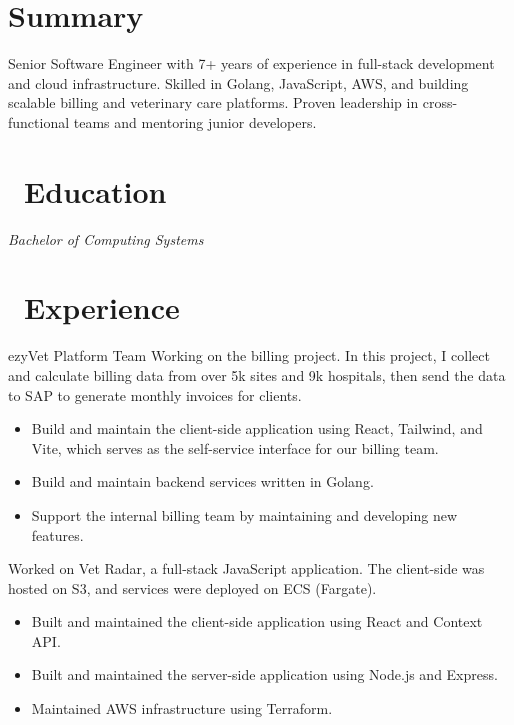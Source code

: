 \documentclass{resume}
\begin{document}



\section*{Summary}
Senior Software Engineer with 7+ years of experience in full-stack development and cloud infrastructure. Skilled in Golang, JavaScript, AWS, and building scalable billing and veterinary care platforms. Proven leadership in cross-functional teams and mentoring junior developers.

\section{\faGraduationCap\ Education}
\textit{Bachelor of Computing Systems}

\section{\faUsers\ Experience}
\role{Senior Software Engineer} {ezyVet Platform Team}
Working on the billing project. In this project, I collect and calculate billing data from over 5k sites and 9k hospitals, then send the data to SAP to generate monthly invoices for clients.
\begin{itemize}
  \item Build and maintain the client-side application using React, Tailwind, and Vite, which serves as the self-service interface for our billing team.
  \item Build and maintain backend services written in Golang.
  \item Support the internal billing team by maintaining and developing new features.
\end{itemize}

Worked on Vet Radar, a full-stack JavaScript application. The client-side was hosted on S3, and services were deployed on ECS (Fargate).
\begin{itemize}
  \item Built and maintained the client-side application using React and Context API.
  \item Built and maintained the server-side application using Node.js and Express.
  \item Maintained AWS infrastructure using Terraform.
\end{itemize}
\end{document}
